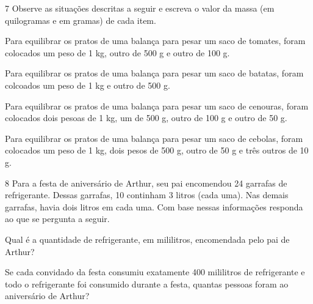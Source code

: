 \begin{mdframed}[linewidth=2pt,linecolor=salmao,roundcorner=2pt]

\num{7} Observe as situações descritas a seguir e escreva o valor da massa (em quilogramas e em gramas) de cada item.

\begin{escolha}
\item
  Para equilibrar os pratos de uma balança para pesar um saco de tomates, foram colocados um peso de 1 kg, outro de 500 g e outro de 100 g.

\item
  Para equilibrar os pratos de uma balança para pesar um saco de batatas, foram colcoados um peso de 1 kg e outro de 500 g.

\item
  Para equilibrar os pratos de uma balança para pesar um saco de cenouras, foram colocados dois pesoas de 1 kg, um de 500 g, outro de 100 g e outro de 50 g.

\item
  Para equilibrar os pratos de uma balança para pesar um saco de cebolas, foram colocados um peso de 1 kg, dois pesos de 500 g, outro de 50 g e três outros de 10 g.
\end{escolha}

\num{8} Para a festa de aniversário de Arthur, seu pai encomendou 24 garrafas de
refrigerante. Dessas garrafas, 10 continham 3 litros (cada uma). Nas
demais garrafas, havia dois litros em cada uma. Com base nessas
informações responda ao que se pergunta a seguir.

\begin{escolha}
\item
  Qual é a quantidade de refrigerante, em mililitros, encomendada pelo pai de Arthur?


\item
  Se cada convidado da festa consumiu exatamente 400 mililitros de refrigerante e
  todo o refrigerante foi consumido durante a festa, quantas pessoas
  foram ao aniversário de Arthur?

\end{escolha}


\end{mdframed}
